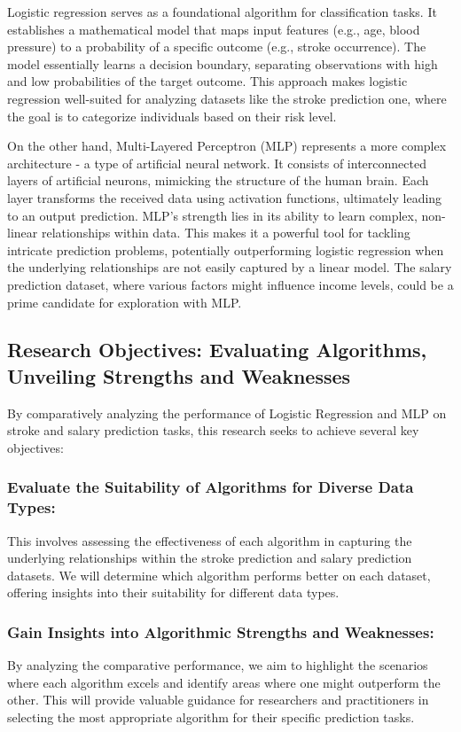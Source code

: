\documentclass[runningheads]{paper}
\begin{document}
Logistic regression serves as a foundational algorithm for classification tasks.
It establishes a mathematical model that maps input features (e.g., age, blood 
pressure) to a probability of a specific outcome (e.g., stroke occurrence). The 
model essentially learns a decision boundary, separating observations with high 
and low probabilities of the target outcome. This approach makes logistic 
regression well-suited for analyzing datasets like the stroke prediction one,
where the goal is to categorize individuals based on their risk level.

On the other hand, Multi-Layered Perceptron (MLP) represents a more complex 
architecture - a type of artificial neural network. It consists of interconnected 
layers of artificial neurons, mimicking the structure of the human brain. Each 
layer transforms the received data using activation functions, ultimately leading 
to an output prediction. MLP's strength lies in its ability to learn complex, 
non-linear relationships within data. This makes it a powerful tool for tackling 
intricate prediction problems, potentially outperforming logistic regression 
when the underlying relationships are not easily captured by a linear model. 
The salary prediction dataset, where various factors might influence income 
levels, could be a prime candidate for exploration with MLP.

\subsection{Research Objectives: Evaluating Algorithms, Unveiling Strengths and Weaknesses}
By comparatively analyzing the performance of Logistic Regression and MLP on 
stroke and salary prediction tasks, this research seeks to achieve several key 
objectives:

\subsubsection{Evaluate the Suitability of Algorithms for Diverse Data Types:}
This involves assessing the effectiveness of each algorithm in capturing the 
underlying relationships within the stroke prediction and salary prediction 
datasets. We will determine which algorithm performs better on each dataset, 
offering insights into their suitability for different data types.

\subsubsection{Gain Insights into Algorithmic Strengths and Weaknesses:}
By analyzing the comparative performance, we aim to highlight the scenarios where
each algorithm excels and identify areas where one might outperform the other. 
This will provide valuable guidance for researchers and practitioners in 
selecting the most appropriate algorithm for their specific prediction tasks. 
\end{document}
